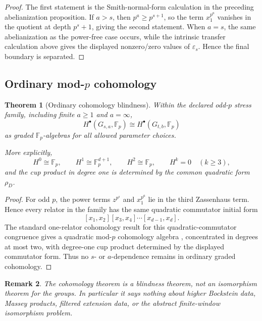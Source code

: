 \documentclass[11pt]{article}
\newtheorem{theorem}{Theorem}[section]
\newtheorem{remark}[theorem]{Remark}
\newcommand{\Fp}{\mathbb F_p}
\begin{document}
\begin{proof}
The first statement is the Smith-normal-form calculation in the preceding
abelianization proposition.  If $a>s$, then $p^a\ge p^{s+1}$, so the
term $x_1^{p^a}$ vanishes in the quotient at depth $p^s+1$, giving the
second statement.  When $a=s$, the same abelianization as the power-free
case occurs, while the intrinsic transfer calculation above gives the
displayed nonzero/zero values of $\varepsilon_s$.  Hence the final
boundary is separated.
\end{proof}

\subsection{\texorpdfstring{Ordinary mod-$p$ cohomology}{Ordinary mod-p cohomology}}

\begin{theorem}[Ordinary cohomology blindness]
Within the declared odd-$p$ stress family, including finite
\(a\ge1\) and \(a=\infty\),
\[
\boxed{
H^\bullet(G_{s,a},\Fp)
\cong
H^\bullet(G_{t,b},\Fp)
}
\]
as graded \(\Fp\)-algebras for all allowed parameter choices.

More explicitly,
\[
H^0\cong\Fp,\qquad
H^1\cong\Fp^{d+1},\qquad
H^2\cong\Fp,\qquad
H^k=0\quad(k\ge3),
\]
and the cup product in degree one is determined by the common quadratic
form \(\rho_D\).
\end{theorem}

\begin{proof}
For odd $p$, the power terms \(z^{p^s}\) and \(x_1^{p^a}\) lie in the
third Zassenhaus term.  Hence every relator in the family has the same
quadratic commutator initial form
\[
[x_1,x_2][x_3,x_4]\cdots[x_{d-1},x_d].
\]
The standard one-relator cohomology result for this quadratic-commutator
congruence gives a quadratic mod-$p$ cohomology algebra
\cite{Quadrelli2022}, concentrated
in degrees at most two, with degree-one cup product determined by the
displayed commutator form.  Thus no $s$- or $a$-dependence remains in
ordinary graded cohomology.
\end{proof}

\begin{remark}
The cohomology theorem is a blindness theorem, not an isomorphism
theorem for the groups.  In particular it says nothing about higher
Bockstein data, Massey products, filtered extension data, or the
abstract finite-window isomorphism problem.
\end{remark}
\end{document}
